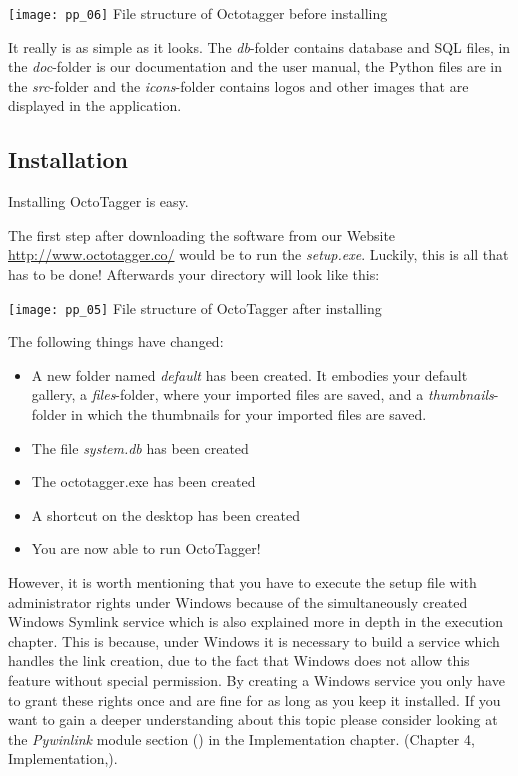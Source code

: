 \begin{center}
\texttt{[image: pp\_06]}
\small{File structure of Octotagger before installing}
\end{center}

It really is as simple as it looks. The \textit{db}-folder contains database and SQL files, in the \textit{doc}-folder is our documentation and the user manual, the Python files are in the \textit{src}-folder and the \textit{icons}-folder contains logos and other images that are displayed in the application.

\subsection{Installation}
Installing OctoTagger is easy.

The first step after downloading the software from our Website \url{http://www.octotagger.co/} would be to run the \textit{setup.exe}. Luckily, this is all that has to be done! Afterwards your directory will look like this:

\begin{center}
\texttt{[image: pp\_05]}
\small{File structure of OctoTagger after installing}
\end{center}


The following things have changed:
\begin{itemize}
	\item A new folder named \textit{default} has been created. It embodies your default gallery, a \textit{files}-folder, where your imported files are saved, and a \textit{thumbnails}-folder in which the thumbnails for your imported files are saved.
	\item The file \textit{system.db} has been created
	\item The octotagger.exe has been created
	\item A shortcut on the desktop has been created
	\item You are now able to run OctoTagger!
\end{itemize}

However, it is worth mentioning that you have to execute the setup file with administrator rights under Windows because of the simultaneously created Windows Symlink service which is also explained more in depth in the execution chapter. This is because, under Windows it is necessary to build a service which handles the link creation, due to the fact that Windows does not allow this feature without special permission. By creating a Windows service you only have to grant these rights once and are fine for as long as you keep it installed. If you want to gain a deeper understanding about this topic please consider looking at the \textit{Pywinlink} module section () in the Implementation chapter. (Chapter 4, Implementation,). %

